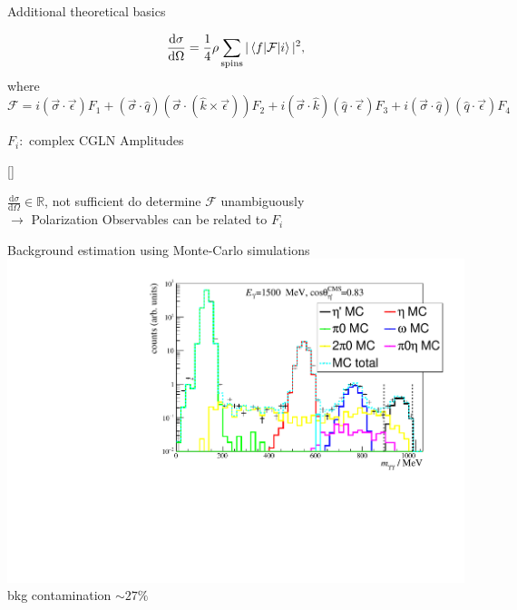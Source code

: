 \documentclass[11pt,aspectratio=169,dvipsnames]{beamer}
\newcommand{\thecolor}{black!70!blue}
\begin{document}
\begin{frame}{Additional theoretical basics}
	\begin{tcolorbox}[colback=blue!5,colframe=\thecolor,title=Unpolarized differential cross section]
		
		$$\frac{\text{d}\sigma}{\text{d}\Omega}=\frac{1}{4}\rho\sum_{\text{spins}}|\braket{f|\mathcal{F}|i}|^2\\,$$
		where
		$$\mathcal{F}=i(\vec{\sigma}\cdot\vec{\epsilon})F_1+(\vec{\sigma}\cdot\hat{q})(\vec{\sigma}\cdot(\hat{k}\times\vec{\epsilon}))F_2+i(\vec{\sigma}\cdot\hat{k})(\hat{q}\cdot\vec{\epsilon})F_3+i(\vec{\sigma}\cdot\hat{q})(\hat{q}\cdot\vec{\epsilon})F_4$$
		\begin{flushright}
			$F_i:$ complex CGLN Amplitudes
		\end{flushright}
		
		
		\begin{flushright}
			{\scriptsize[\cite{cgln}]}
		\end{flushright}
	\end{tcolorbox}
	$\frac{\text{d}\sigma}{\text{d}\Omega}\in\mathbb{R}$, not sufficient do determine $\mathcal{F}$ unambiguously\\
	$\rightarrow$ Polarization Observables can be related to $F_i$
\end{frame}
\begin{frame}{Background estimation using Monte-Carlo simulations}
	\centering
	\includegraphics[width=.8\linewidth]{figs/inv_mass_bin.pdf}\vspace{-0.5cm}\\
	bkg contamination $\sim 27\%$
\end{frame}
\end{document}
